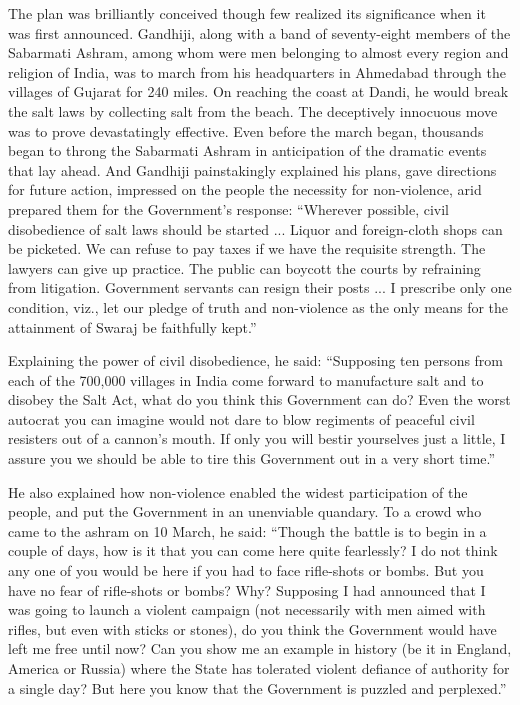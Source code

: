 \begin{multicols}{2}
The plan was brilliantly conceived though few realized its significance when it was first announced. Gandhiji, along with a band of seventy-eight members of the Sabarmati Ashram, among whom were men belonging to almost every region and religion of India, was to march from his headquarters in Ahmedabad through the villages of Gujarat for 240 miles. On reaching the coast at Dandi, he would break the salt laws by collecting salt from the beach. The deceptively innocuous move was to prove devastatingly effective. Even before the march began, thousands began to throng the Sabarmati Ashram in anticipation of the dramatic events that lay ahead. And Gandhiji painstakingly explained his plans, gave directions for future action, impressed on the people the necessity for non-violence, arid prepared them for the Government's response: ``Wherever possible, civil disobedience of salt laws should be started ... Liquor and foreign-cloth shops can be picketed. We can refuse to pay taxes if we have the requisite strength. The lawyers can give up practice. The public can boycott the courts by refraining from litigation. Government servants can resign their posts ... I prescribe only one condition, viz., let our pledge of truth and non-violence as the only means for the attainment of Swaraj be faithfully kept.''

Explaining the power of civil disobedience, he said: ``Supposing ten persons from each of the 700,000 villages in India come forward to manufacture salt and to disobey the Salt Act, what do you think this Government can do? Even the worst autocrat you can imagine would not dare to blow regiments of peaceful civil resisters out of a cannon's mouth. If only you will bestir yourselves just a little, I assure you we should be able to tire this Government out in a very short time.''

He also explained how non-violence enabled the widest participation of the people, and put the Government in an unenviable quandary. To a crowd who came to the ashram on 10 March, he said: ``Though the battle is to begin in a couple of days, how is it that you can come here quite fearlessly? I do not think any one of you would be here if you had to face rifle-shots or bombs. But you have no fear of rifle-shots or bombs? Why? Supposing I had announced that I was going to launch a violent campaign (not necessarily with men aimed with rifles, but even with sticks or stones), do you think the Government would have left me free until now? Can you show me an example in history (be it in England, America or Russia) where the State has tolerated violent defiance of authority for a single day? But here you know that the Government is puzzled and perplexed.''


\end{multicols}

